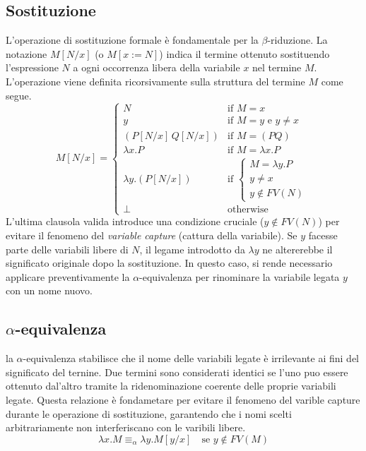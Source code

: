 \subsection{Sostituzione}
L'operazione di sostituzione formale è fondamentale per la $\beta$-riduzione. La notazione $M[N/x]$ (o $M[x := N]$) 
indica il termine ottenuto sostituendo l'espressione $N$ a ogni occorrenza libera della variabile $x$ nel termine $M$. 
L'operazione viene definita ricorsivamente sulla struttura del termine $M$ come segue.
\begin{equation}
    M[N/x] = 
    \begin{cases} 
        N & \text{if } M = x                        \\
        y & \text{if } M = y \text{ e } y \neq x    \\
        (P[N/x] \, Q[N/x]) & \text{if } M = (P Q)   \\
        \lambda x. P & \text{if } M = \lambda x. P  \\
        \lambda y. (P[N/x]) & \text{if } 
            \begin{cases} 
            M = \lambda y. P    \\
            y \neq x            \\
            y \notin FV(N)
            \end{cases}         \\
        \perp & \text{otherwise}
    \end{cases}
    \label{eq:substitution_algorithm}
\end{equation}
L'ultima clausola valida introduce una condizione cruciale ($y \notin FV(N)$) per evitare il fenomeno del \emph{variable capture} (cattura della variabile).
Se $y$ facesse parte delle variabili libere di $N$, il legame introdotto da $\lambda y$ ne altererebbe il significato originale dopo la sostituzione. In questo 
caso, si rende necessario applicare preventivamente la $\alpha$-equivalenza per rinominare la variabile legata $y$ con un nome nuovo.

\subsection{\texorpdfstring{$\alpha$}{alpha}-equivalenza}
la $\alpha$-equivalenza stabilisce che il nome delle variabili legate è irrilevante ai fini del significato del ternine. Due termini sono considerati 
identici se l'uno puo essere ottenuto dal'altro tramite la ridenominazione coerente delle proprie variabili legate. Questa relazione è fondametare per 
evitare il fenomeno del varible capture durante le operazione di sostituzione, garantendo che i nomi scelti arbitrariamente non interferiscano con 
le varibili libere.
\begin{equation}
    \lambda x. M \equiv_\alpha \lambda y. M[y/x] \quad \text{se } y \notin FV(M)
    \label{eq:alpha_conversion}
\end{equation}

